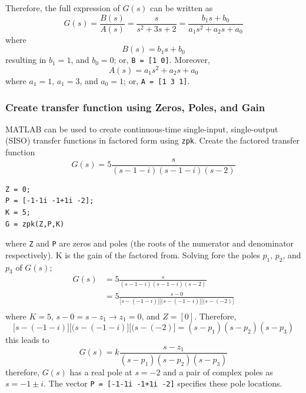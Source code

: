 \documentclass[12pt,letter]{article}
\begin{document}
Therefore, the full expression of $G(s)$ can be written as
\begin{equation}
G(s) = \frac{B(s)}{A(s)} = \frac{s}{s^2 + 3s + 2} = \frac{b_1s + b_0}{a_1s^2 + a_2 s + a_0}
\end{equation}
where 
\begin{equation}
B(s) = b_1s + b_0 
\end{equation}
resulting in  $b_1=1$, and $b_0=0$; or, \texttt{B = [1 0]}. Moreover, 
\begin{equation}
A(s) = a_1s^2 + a_2 s + a_0
\end{equation}
where $a_1=1$, $a_1=3$, and $a_0=1$; or, \texttt{A = [1 3 1]}.

\subsubsection{Create transfer function using Zeros, Poles, and Gain}

MATLAB can be used to create continuous-time single-input, single-output (SISO) transfer functions in factored form using \texttt{zpk}. Create the factored transfer function 
\begin{equation}
G(s) =  5 \frac{s}{(s-1-i)(s-1-i)(s-2)}
\end{equation}

\lstset{linewidth=5.8in}
\begin{minipage}{1\textwidth}
  \begin{center}
\begin{lstlisting}
Z = 0;
P = [-1-1i -1+1i -2]; 
K = 5;
G = zpk(Z,P,K)
\end{lstlisting}
  \end{center}
\end{minipage}

\noindent where \texttt{Z} and \texttt{P} are zeros and poles (the roots of the numerator and denominator respectively). K is the gain of the factored from. Solving fore the poles $p_1$, $p_2$, and $p_3$ of $G(s)$;
\begin{align}
G(s) &=  5 \frac{s}{(s-1-i)(s-1-i)(s-2)} \\
&=  5 \frac{s-0}{\big[s-(-1-i)\big]\big[(s-(-1-i)\big]\big[(s-(-2)\big]} \nonumber \\
\end{align}
where $K=5$, $s-0=s-z_1 \rightarrow z_1 = 0$, and $Z=[0]$. Therefore, 
\begin{equation}
\big[s-(-1-i)\big]\big[(s-(-1-i)\big]\big[(s-(-2)\big] = (s-p_1)(s-p_2)(s-p_3)
\end{equation}
this leads to
\begin{equation}
G(s) =  k \frac{s-z_1}{(s-p_1)(s-p_2)(s-p_3)}
\end{equation}
therefore, $G(s)$ has a real pole at $s=-2$ and a pair of complex poles as $s= -1 \pm i$. The vector \texttt{P = [-1-1i -1+1i -2]} specifies these pole locations.
\end{document}
